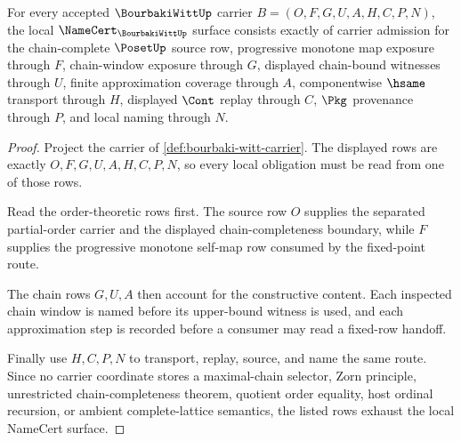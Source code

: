 \begin{theorem}
\label{thm:bourbaki-witt-namecert-obligations}
For every accepted $\BourbakiWittUp$ carrier $B=(O,F,G,U,A,H,C,P,N)$, the local $\NameCert_{\BourbakiWittUp}$ surface consists exactly of carrier admission for the chain-complete $\PosetUp$ source row, progressive monotone map exposure through $F$, chain-window exposure through $G$, displayed chain-bound witnesses through $U$, finite approximation coverage through $A$, componentwise $\hsame$ transport through $H$, displayed $\Cont$ replay through $C$, $\Pkg$ provenance through $P$, and local naming through $N$.
\end{theorem}
\begin{proof}
Project the carrier of \autoref{def:bourbaki-witt-carrier}. The displayed rows are exactly $O,F,G,U,A,H,C,P,N$, so every local obligation must be read from one of those rows.

Read the order-theoretic rows first. The source row $O$ supplies the separated partial-order carrier and the displayed chain-completeness boundary, while $F$ supplies the progressive monotone self-map row consumed by the fixed-point route.

The chain rows $G,U,A$ then account for the constructive content. Each inspected chain window is named before its upper-bound witness is used, and each approximation step is recorded before a consumer may read a fixed-row handoff.

Finally use $H,C,P,N$ to transport, replay, source, and name the same route. Since no carrier coordinate stores a maximal-chain selector, Zorn principle, unrestricted chain-completeness theorem, quotient order equality, host ordinal recursion, or ambient complete-lattice semantics, the listed rows exhaust the local NameCert surface.
\end{proof}

